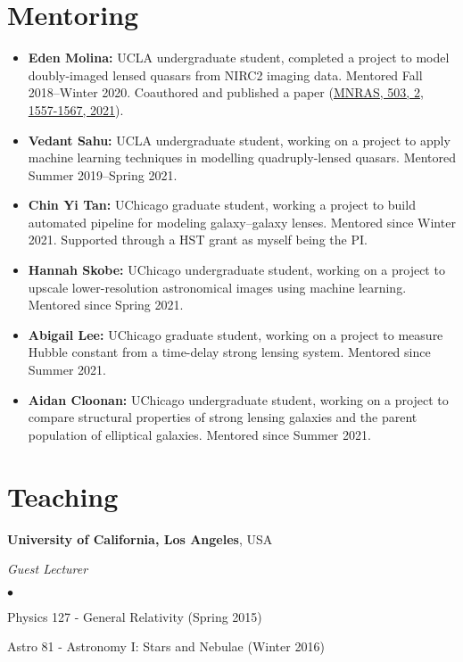 \documentclass[margin, line]{res}
\newenvironment{list2}{
  \begin{list}{$\bullet$}{%
      \setlength{\itemsep}{0in}
      \setlength{\parsep}{0in} \setlength{\parskip}{0in}
      \setlength{\topsep}{0in} \setlength{\partopsep}{0in} 
      \setlength{\leftmargin}{0.2in}}}{\end{list}}
\begin{document}
\begin{resume}
\section{\sc Mentoring}
\begin{itemize}
	\item \textbf{Eden Molina:} UCLA undergraduate student, completed a project to model doubly-imaged lensed quasars from NIRC2 imaging data. Mentored Fall 2018--Winter 2020. Coauthored and published a paper (\href{https://doi:10.1093/mnras/stab532}{MNRAS, 503, 2, 1557-1567, 2021}).
	\item \textbf{Vedant Sahu:} UCLA undergraduate student, working on a project to apply machine learning techniques in modelling quadruply-lensed quasars. Mentored Summer 2019--Spring 2021.
	\item \textbf{Chin Yi Tan:} UChicago graduate student, working a project to build automated pipeline for modeling galaxy--galaxy lenses. Mentored since Winter 2021. Supported through a \textsc{HST} grant as myself being the PI.
	\item \textbf{Hannah Skobe:} UChicago undergraduate student, working on a project to upscale lower-resolution astronomical images using machine learning. Mentored since Spring 2021.
	\item \textbf{Abigail Lee:} UChicago graduate student, working on a project to measure Hubble constant from a time-delay strong lensing system. Mentored since Summer 2021.
	\item \textbf{Aidan Cloonan:} UChicago undergraduate student, working on a project to compare structural properties of strong lensing galaxies and the parent population of elliptical galaxies. Mentored since Summer 2021.
\end{itemize}


\section{\sc Teaching}
{\bf University of California, Los Angeles}, USA



{\em Guest Lecturer} \hfill {\bf}\\
\begin{list2}
	\item Physics 127 - General Relativity (Spring 2015)
	\item Astro 81 - Astronomy I: Stars and Nebulae (Winter 2016)
\end{list2}
	

\end{resume}
\end{document}
